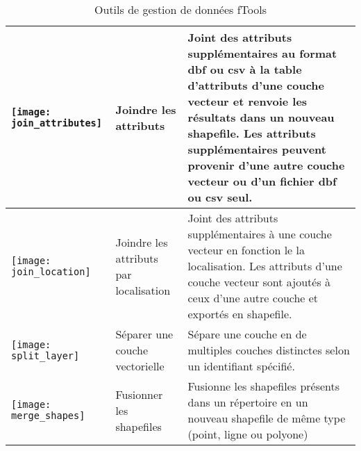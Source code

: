 \begin{table}[ht]
\begin{tabular}{|m{1cm}|m{3cm}|m{12cm}|}
 \hline \texttt{[image: join\_attributes]} & Joindre les attributs & Joint des attributs supplémentaires au format dbf ou csv à la table d'attributs d'une couche vecteur et renvoie les résultats dans un nouveau shapefile. Les attributs supplémentaires peuvent provenir d'une autre couche vecteur ou d'un fichier dbf ou csv seul. \\
 \hline \texttt{[image: join\_location]} & Joindre les attributs par localisation & Joint des attributs supplémentaires à une couche vecteur en fonction le la localisation. Les attributs d'une couche vecteur sont ajoutés à ceux d'une autre couche et exportés en shapefile. \\
 \hline \texttt{[image: split\_layer]} & Séparer une couche vectorielle & Sépare une couche en de multiples couches distinctes selon un identifiant spécifié. \\
 \hline \texttt{[image: merge\_shapes]} & Fusionner les shapefiles & Fusionne les shapefiles présents dans un répertoire en un nouveau shapefile de même type (point, ligne ou polyone) \\
 \hline
\end{tabular}
\caption{Outils de gestion de données fTools}\label{tab:fTool_data_management}
\end{table}

\FloatBarrier
